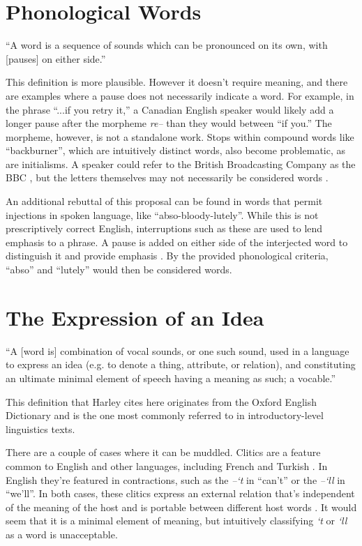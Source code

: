 \documentclass{article}
\begin{document}
\section{Phonological Words}

\begin{displayquote}
``A word is a sequence of sounds which can be pronounced on its own, with [pauses] on either side.'' \cite{words}
\end{displayquote}

This definition is more plausible. However it doesn't require meaning, and there are examples where a pause does not necessarily indicate a word. For example, in the phrase ``...if you retry it,'' a Canadian English speaker would likely add a longer pause after the morpheme \textit{re--} than they would between ``if you.'' The morpheme, however, is not a standalone work. Stops within compound words like ``backburner'', which are intuitively distinct words, also become problematic, as are initialisms. A speaker could refer to the British Broadcasting Company as the BBC \textipa{[bi(.)bi(.)si]}, but the letters themselves may not necessarily be considered words \cite{trask}.

An additional rebuttal of this proposal can be found in words that permit injections in spoken language, like ``abso-bloody-lutely''. While this is not prescriptively correct English, interruptions such as these are used to lend emphasis to a phrase. A pause is added on either side of the interjected word to distinguish it and provide emphasis \cite{allwood}. By the provided phonological criteria, ``abso'' and ``lutely'' would then be considered words.

\section{The Expression of an Idea}

\begin{displayquote}
``A [word is] combination of vocal sounds, or one such sound, used in a language to express an idea (e.g. to denote a thing, attribute, or relation), and constituting an ultimate minimal element of speech having a meaning as such; a vocable.'' \cite{words}
\end{displayquote}

This definition that Harley cites here originates from the Oxford English Dictionary and is the one most commonly referred to in introductory-level linguistics texts.

There are a couple of cases where it can be muddled. Clitics are a feature common to English and other languages, including French and Turkish \cite{trask}. In English they're featured in contractions, such as the \textit{--`t} in ``can't'' or the \textit{--`ll} in ``we'll''. In both cases, these clitics express an external relation that's independent of the meaning of the host and is portable between different host words \cite{nevis1994clitics}. It would seem that it is a minimal element of meaning, but intuitively classifying \textit{`t} or \textit{`ll} as a word is unacceptable.
\end{document}
